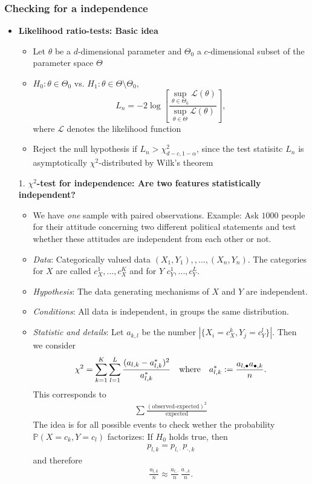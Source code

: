 \documentclass[12pt,a4paper]{amsart}
\theoremstyle{definition}
\theoremstyle{remark}
\numberwithin{equation}{section}
\begin{document}
\subsubsection{Checking for a independence}

\begin{itemize}
\item \textbf{Likelihood ratio-tests: Basic idea}
\begin{itemize}
\item Let $\theta$ be a $d$-dimensional parameter and $\Theta_0$ a $c$-dimensional subset of the parameter space $\Theta$
\item $H_0: \theta\in \Theta_0$ vs. $H_1:\theta\in \Theta\setminus \Theta_0$,
$$L_n=-2\log\left[\frac{\sup_{\theta\in\Theta_0} \mathcal{L}(\theta)}{\sup_{\theta\in\Theta} \mathcal{L}(\theta)}\right],$$
where $\mathcal{L}$ denotes the likelihood function
\item Reject the null hypothesis if $L_n>\chi^2_{d-c,1-\alpha}$, since the test statisitc $L_n$ is asymptotically $\chi^2$-distributed by Wilk's theorem 

\end{itemize}
\item[1.] \textbf{$\chi^2$-test for independence: Are two features statistically independent?}
\begin{itemize}
\item We have \textit{one} sample with paired observations. Example: Ask $1000$ people for their attitude concerning two different political statements and test whether these attitudes are independent from each other or not.
\item \textit{Data}: Categorically valued data $(X_1,Y_1),,...,(X_n,Y_n)$. The categories for $X$ are called $c_X^1,...,c_X^K$ and for $Y$ $c_Y^1,...,c_Y^L$. 
\item \textit{Hypothesis}: The data generating mechanisms of $X$ and $Y$ are independent.
\item \textit{Conditions}: All data is independent, in groups the same distribution.
\item \textit{Statistic and details}: Let $a_{k,l}$ be the number  $|\{X_i=c_X^k, Y_j=c_Y^l\}|$. Then we consider 
$$\chi^2=\sum_{k=1}^K \sum_{l=1} ^L \frac{(a_{l,k}-a_{l,k}^*)^2}{a_{l,k}^*} \quad \textnormal{where} \quad a_{l,k}^*:=\frac{a_{l, \bullet}a_{\bullet,k}}{n}.$$
This corresponds to
\begin{align*}
\sum \frac{(\text{observed-expected})^2}{\text{expected}}
\end{align*}
The idea is for all possible events to check wether the probability $\mathbb{P}(X=c_k, Y=c_l)$ factorizes: If $H_0$ holds true, then
\begin{align*}
p_{l,k}=p_{l,\cdot}\, p_{\cdot,k}
\end{align*}
and therefore 
\begin{align*}
\frac{a_{l,k}}{n}\approx \frac{a_{l,\cdot}}{n} \, \frac{a_{\cdot,k}}{n}.
\end{align*}
\medskip


\end{itemize}
\end{itemize}
\end{document}
